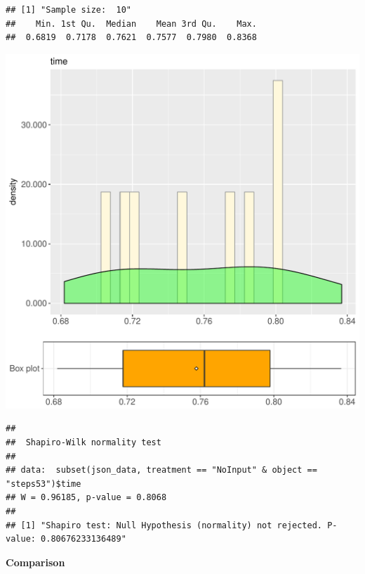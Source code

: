 \documentclass{article}\usepackage[]{graphicx}\usepackage[]{color}
\makeatletter
\def\maxwidth{ %
  \ifdim\Gin@nat@width>\linewidth
    \linewidth
  \else
    \Gin@nat@width
  \fi
}
\newenvironment{kframe}{%
 \def\at@end@of@kframe{}%
 \ifinner\ifhmode%
  \def\at@end@of@kframe{\end{minipage}}%
  \begin{minipage}{\columnwidth}%
 \fi\fi%
 \def\FrameCommand##1{\hskip\@totalleftmargin \hskip-\fboxsep
 \colorbox{shadecolor}{##1}\hskip-\fboxsep
     \hskip-\linewidth \hskip-\@totalleftmargin \hskip\columnwidth}%
 \MakeFramed {\advance\hsize-\width
   \@totalleftmargin\z@ \linewidth\hsize
   \@setminipage}}%
 {\par\unskip\endMakeFramed%
 \at@end@of@kframe}
\newenvironment{knitrout}{}{} %
\makeatother
\begin{document}
\begin{knitrout}
\color{fgcolor}\begin{kframe}
\begin{verbatim}
## [1] "Sample size:  10"
##    Min. 1st Qu.  Median    Mean 3rd Qu.    Max. 
##  0.6819  0.7178  0.7621  0.7577  0.7980  0.8368
\end{verbatim}
\end{kframe}
\includegraphics[width=\maxwidth]{figure/RH4_NoInput_steps53-1} 
\begin{kframe}\begin{verbatim}
## 
## 	Shapiro-Wilk normality test
## 
## data:  subset(json_data, treatment == "NoInput" & object == "steps53")$time
## W = 0.96185, p-value = 0.8068
## 
## [1] "Shapiro test: Null Hypothesis (normality) not rejected. P-value: 0.80676233136489"
\end{verbatim}
\end{kframe}
\end{knitrout}
  
 \textbf{Comparison}
  
\end{document}
